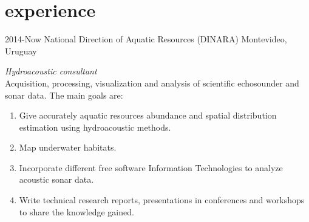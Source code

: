 \documentclass[]{friggeri-cv} %
\begin{document}
\section{experience}
\begin{entrylist}

\entry
{2014-Now}
{National Direction of Aquatic Resources (DINARA)}
{Montevideo, Uruguay}
{\emph{Hydroacoustic consultant} \\ Acquisition, processing, visualization and analysis of scientific echosounder and sonar data. The main goals are:
	\begin{enumerate}
		\item Give accurately aquatic resources abundance and spatial distribution estimation using hydroacoustic methods.
		\item Map underwater habitats.
		\item Incorporate different free software Information Technologies to analyze acoustic sonar data.
		\item Write technical research reports, presentations in conferences and workshops to share the knowledge gained.\\   
	\end{enumerate}
	}
\end{entrylist}
\end{document}

